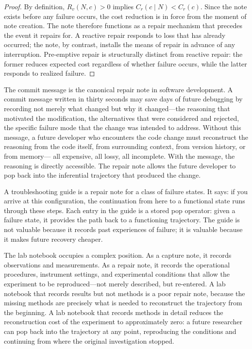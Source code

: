 \documentclass[12pt, a4paper]{article}
\theoremstyle{plain}
\theoremstyle{definition}
\theoremstyle{remark}
\begin{document}
\begin{proof}
By definition, $R_v(N, c) > 0$ implies $C_r(c \mid N) < C_r(c)$. Since the note
exists before any failure occurs, the cost reduction is in force from the moment
of note creation. The note therefore functions as a repair mechanism that precedes
the event it repairs for. A reactive repair responds to loss that has already
occurred; the note, by contrast, installs the means of repair in advance of any
interruption. Pre-emptive repair is structurally distinct from reactive repair:
the former reduces expected cost regardless of whether failure occurs, while the
latter responds to realized failure.
\end{proof}

The commit message is the canonical repair note in software development. A commit
message written in thirty seconds may save days of future debugging by recording
not merely what changed but why it changed---the reasoning that motivated the
modification, the alternatives that were considered and rejected, the specific
failure mode that the change was intended to address. Without this message, a
future developer who encounters the code change must reconstruct the reasoning from
the code itself, from surrounding context, from version history, or from memory---
all expensive, all lossy, all incomplete. With the message, the reasoning is
directly accessible. The repair note allows the future developer to pop back into
the inferential trajectory that produced the change.

A troubleshooting guide is a repair note for a class of failure states. It says:
if you arrive at this configuration, the continuation from here to a functional
state runs through these steps. Each entry in the guide is a stored pop
operator: given a failure state, it provides the path back to a functioning
trajectory. The guide is not valuable because it records past experiences of
failure; it is valuable because it makes future recovery cheaper.

The lab notebook occupies a complex position. As a capture note, it records
observations and measurements. As a repair note, it records the operational
procedures, instrument settings, and experimental conditions that allow the
experiment to be reproduced---not merely described, but re-entered. A lab notebook
that records results but not methods is a poor repair note, because the missing
methods are precisely what is needed to reconstruct the trajectory from the
beginning. A lab notebook that records methods in detail reduces the reconstruction
cost of the experiment to approximately zero: a future researcher can pop back into
the trajectory at any point, reproducing the conditions and continuing from where
the original investigation stopped.
\end{document}
